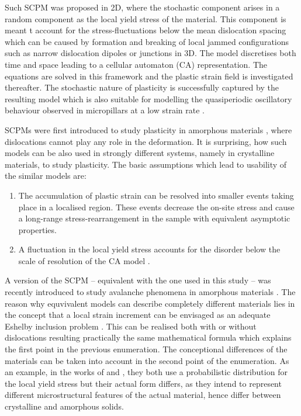 Such SCPM was proposed in 2D\cite{1742-5468-2005-08-P08004}, where the stochastic component arises in a random component as the local yield stress of the material. This component is meant t account for the stress-fluctuations below the mean dislocation spacing which can be caused by formation and breaking of local jammed configurations such as narrow dislocation dipoles or junctions in 3D. The model discretises both time and space leading to a cellular automaton (CA) representation. The equations are solved in this framework and the plastic strain field is investigated thereafter. The stochastic nature of plasticity is successfully captured by the resulting model \cite{1742-5468-2007-04-P04013} which is also suitable for modelling the quasiperiodic oscillatory behaviour observed in micropillars at a low strain rate \cite{papanikolaou2012quasi}.

SCPMs were first introduced to study plasticity in amorphous materials \cite{0965-0393-2-2-001,PhysRevLett.89.195506}, where dislocations cannot play any role in the deformation. It is surprising, how such models can be also used in strongly different systems, namely in crystalline materials, to study plasticity. The basic assumptions which lead to usability of the similar models are:
\begin{enumerate}
\item The accumulation of plastic strain can be resolved into smaller events taking place in a localised region. These events decrease the on-site stress and cause a long-range stress-rearrangement in the sample with equivalent asymptotic properties.
\item A fluctuation in the local yield stress accounts for the disorder below the scale of resolution of the CA model .
\end{enumerate}

A version of the SCPM -- equivalent with the one used in this study -- was recently introduced to study avalanche phenomena in amorphous materials \cite{PhysRevE.84.016115,PhysRevE.88.062403,1742-5468-2015-2-P02011,PhysRevLett.116.065501}. The reason why equvivalent models can describe completely different materials lies in the concept that a local strain increment can be envisaged as an adequate Eshelby inclusion problem \cite{Eshelby376}. This can be realised both with or without dislocations resulting practically the same mathematical formula which explains the first point in the previous enumeration. The conceptional differences of the materials can be taken into account in the second point of the enumeration. As an example, in the works of \citet{PhysRevE.84.016115} and \citet{1742-5468-2005-08-P08004}, they both use a probabilistic distribution for the local yield stress but their actual form differs, as they intend to represent different microstructural features of the actual material, hence differ between crystalline and amorphous solids.

